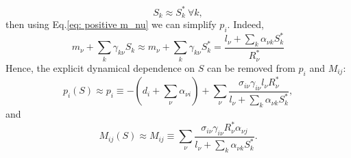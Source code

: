 \documentclass[12pt]{report}
\begin{document}
\begin{equation}
S_k \approx S^*_k \ \forall k,
\end{equation}
then using Eq.\eqref{eq: positive m_nu} we can simplify $p_i$. Indeed,
\begin{equation}
m_\nu + \sum_k \gamma_{k\nu} S_k \approx m_\nu + \sum_k \gamma_{k\nu}S^*_k = \frac{l_\nu + \sum_k \alpha_{\nu k}S^*_k}{R^*_\nu} \label{eq: equality fluxes resource}
\end{equation}
Hence, the explicit dynamical dependence on $S$ can be removed from $p_i$ and $M_{ij}$:
\begin{equation}
p_i(S) \approx p_i \equiv - \left(d_i + \sum_\nu \alpha_{\nu i}\right) + \sum_\nu \frac{\sigma_{i\nu}\gamma_{i\nu}l_\nu R^*_\nu}{l_\nu + \sum_k \alpha_{\nu k}S^*_k},
\end{equation} and
\begin{equation}
M_{ij}(S) \approx M_{ij} \equiv \sum_\nu \frac{\sigma_{i\nu} \gamma_{i\nu} R^*_\nu \alpha_{\nu j}}{l_\nu + \sum_k{\alpha_{\nu k} S^*_k}}.
\end{equation}
\end{document}
